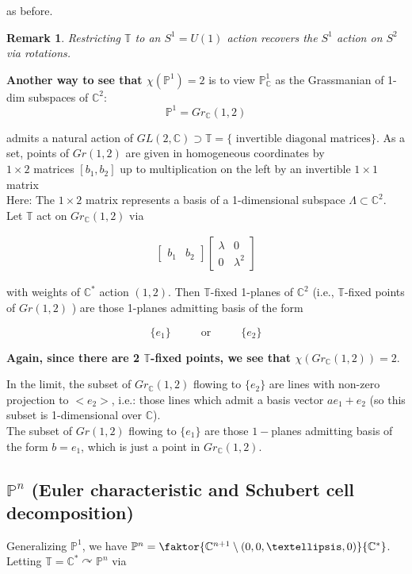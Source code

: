 \documentclass{amsart}
\newtheorem{remark}[theorem]{Remark}
\newcommand{\PP}{\mathbb{P}}\newcommand{\A}{\mathbb{A}}\newcommand{\Z}{\mathbb{Z}}\newcommand{\C}{\mathbb{C}}\newcommand{\N}{\mathbb{N}}\newcommand{\T}{\mathbb{T}}
\begin{document}
as before.

\begin{remark} Restricting $\T$ to an $S^1=U(1)$ action recovers the $S^1$ action on $S^2$ via rotations. \end{remark} 

\textbf{Another way to see that $\chi(\PP^1)=2$} is to view $\PP^1_\C$ as the Grassmanian of 1-dim subspaces of $\C^2$: \[ \PP^1 = Gr_\C(1,2) \] 

admits a natural action of $GL(2,\C) \supset \T = \{\text{ invertible diagonal matrices} \}$. As a set, points of $Gr(1,2)$ are given in homogeneous coordinates by \\

$1\times 2$ matrices $[b_1, b_2]$ up to multiplication on the left by an invertible $1\times 1$ matrix\\

Here: The $1\times 2$ matrix represents a basis of a 1-dimensional subspace $\Lambda \subset \C^2$. Let $\T$ act on $Gr_\C(1,2)$ via 


\begin{align*}
    \left[ \begin{matrix} b_1 & b_2 \end{matrix} \right]\left[ \begin{matrix} \lambda & 0 \\ 0 & \lambda^2 \end{matrix}\right]
\end{align*} 

with weights of $\C^*$ action $(1,2)$. Then $\T$-fixed 1-planes of $\C^2$ (i.e., $\T$-fixed points of $Gr(1,2)$ ) are those 1-planes admitting basis of the form 

\[ \{e_1\} \hspace{1cm} \text{ or } \hspace{1cm} \{e_2\} \] 

\textbf{Again, since there are 2 $\T$-fixed points, we see that $\chi(Gr_\C(1,2))=2$}. 

In the limit, the subset of $Gr_\C(1,2)$ flowing to $\{e_2\}$ are lines with non-zero projection to $<e_2>$, i.e.: those lines which admit a basis vector $ae_1 + e_2$ (so this subset is 1-dimensional over $\C$).\\

The subset of $Gr(1,2)$ flowing to $\{e_1\}$ are those $1-$planes admitting basis of the form $b=e_1$, which is just a point in $Gr_\C(1,2)$. 

\subsection{ $\PP^n$ (Euler characteristic and Schubert cell decomposition)}
Generalizing $\PP^1$, we have $\PP^n = \faktor{\C^{n+1}\setminus(0,0,\dots, 0) }{\C^*}$. Letting $\T = \C^* \curvearrowright \PP^n$ via 
\end{document}
